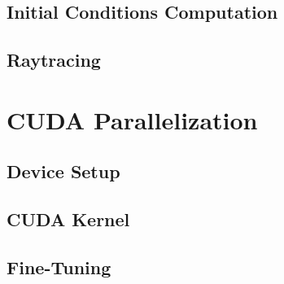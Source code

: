 \subsection{Initial Conditions Computation}
\subsection{Raytracing}

\section{CUDA Parallelization}
\subsection{Device Setup}
\subsection{CUDA Kernel}
\subsection{Fine-Tuning}